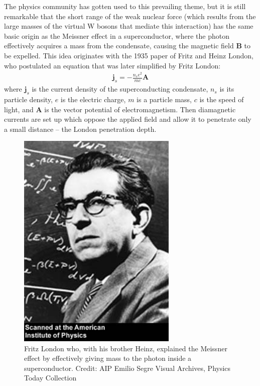 \documentclass[12pt]{iopart}
\begin{document}
The physics community has gotten used to this prevailing theme, but it is still remarkable that the short range of the weak nuclear force (which results from the large masses of the virtual W bosons that mediate this interaction) has the same basic origin as the Meissner effect in a superconductor, where the photon effectively acquires a mass from the condensate, causing the magnetic field $\boldsymbol{B}$ to be expelled. This idea originates with the 1935 paper of Fritz and Heinz London, who postulated an equation that was later simplified by Fritz London:
\begin{eqnarray}
\mathbf{j}_{s} = - \frac{n_se^2}{mc}\mathbf{A} 
\label{eq4.1}
\end{eqnarray}
where $\mathbf{j}_{s}$ is the current density of the superconducting condensate, $n_s$ is its particle density, $e$ is the electric charge, $m$ is a particle mass, $c$ is the speed of light, and $\mathbf{A} $ is the vector potential of electromagnetism. Then diamagnetic currents are set up which oppose the applied field and allow it to penetrate only a small distance -- the London penetration depth. 
\begin{figure}[htbp]
\centering
\includegraphics[bb=0 0 300 500, width=3in]{Fig18-fritz_london.eps}
\caption{Fritz London who, with his brother Heinz, explained the Meissner effect by effectively giving mass to the photon inside a superconductor. Credit: AIP Emilio Segre Visual Archives, Physics Today Collection \label{Fig18-fritz_london.eps}}
\end{figure}
\end{document}
